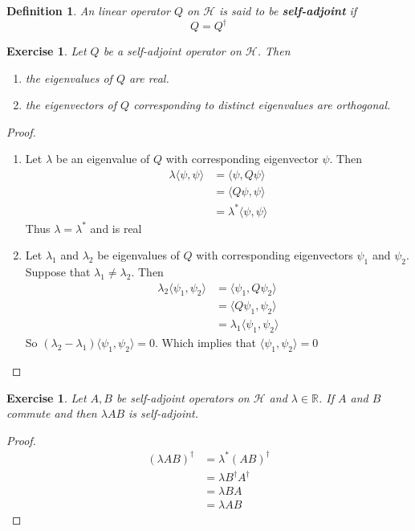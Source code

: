 \documentclass[12pt]{amsart}
\newtheorem{defn}[thm]{Definition}
\newtheorem{ex}[thm]{Exercise}
\renewcommand{\r}{\rangle}
\renewcommand{\l}{\langle}
\newcommand{\lam}{\lambda}
\newcommand{\R}{\mathbb{R}}
\newcommand{\MH}{\mathcal{H}}
\begin{document}
\begin{defn}
	An linear operator $Q$ on $\MH$ is said to be \textbf{self-adjoint} if $$Q = Q^{\dagger}$$
\end{defn}

\begin{ex}
	Let $Q$ be a self-adjoint operator on $\MH$. Then 
	\begin{enumerate}
		\item the eigenvalues of $Q$ are real.
		\item the eigenvectors of $Q$ corresponding to distinct eigenvalues are orthogonal.
	\end{enumerate}
\end{ex}

\begin{proof}
	\ \begin{enumerate}
		\item Let $\lam$ be an eigenvalue of $Q$ with corresponding eigenvector $\psi$. Then 
		\begin{align*}
			\lam \l \psi , \psi\r
			&= \l \psi , Q \psi\r \\
			&= \l Q \psi , \psi\r \\
			&= \lam^* \l \psi , \psi\r
		\end{align*}
		Thus $\lam = \lam^*$ and is real
		
		\item Let $\lam_1$ and $\lam_2$ be eigenvalues of $Q$ with corresponding eigenvectors $\psi_1$ and $\psi_2$. Suppose that $\lam_1 \neq \lam_2$. Then 
		\begin{align*}
			\lam_2 \l \psi_1 ,  \psi_2\r
			&= \l \psi_1 , Q \psi_2\r\\
			&= \l Q \psi_1 ,  \psi_2\r\\
			&= \lam_1 \l \psi_1 ,  \psi_2\r
		\end{align*}
		So $(\lam_2 - \lam_1)\l \psi_1 ,  \psi_2\r = 0$. Which implies that $\l \psi_1 ,  \psi_2\r=0$
	\end{enumerate}
\end{proof}

\begin{ex}
	Let $A, B$ be self-adjoint operators on $\MH$ and $ \lam \in \R$. If $A$ and $B$ commute and then $\lam AB$ is self-adjoint.
\end{ex}

\begin{proof}
	\begin{align*}
		(\lam AB)^{\dagger}
		&= \lam^* (AB)^{\dagger} \\
		&= \lam B^{\dagger} A^{\dagger} \\
		&= \lam B A \\
		&= \lam AB
	\end{align*}
\end{proof}
\end{document}
